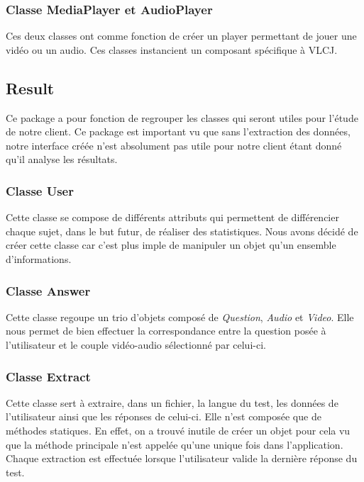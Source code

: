 \subsubsection{Classe MediaPlayer et AudioPlayer}\label{players}

Ces deux classes ont comme fonction de créer un player permettant de jouer une vidéo ou un audio. Ces classes instancient un composant spécifique à VLCJ. 

\subsection{Result}\label{Archi_Results}

Ce package a pour fonction de regrouper les classes qui seront utiles pour l'étude de notre client. Ce package est important vu que sans l'extraction des données, notre interface créée n'est absolument pas utile pour notre client étant donné qu'il analyse les résultats.

\subsubsection{Classe User}

Cette classe se compose de différents attributs qui permettent de différencier chaque sujet, dans le but futur, de réaliser des statistiques. Nous avons décidé de créer cette classe car c'est plus imple de manipuler un objet qu'un ensemble d'informations.

\subsubsection{Classe Answer}

Cette classe regoupe un trio d'objets composé de \textit{Question}, \textit{Audio} et \textit{Video}. Elle nous permet de bien effectuer la correspondance entre la question posée à l'utilisateur et le couple vidéo-audio sélectionné par celui-ci.

\subsubsection{Classe Extract}

Cette classe sert à extraire, dans un fichier, la langue du test, les données de l'utilisateur ainsi que les réponses de celui-ci. Elle n'est composée que de méthodes statiques. En effet, on a trouvé inutile de créer un objet pour cela vu que la méthode principale n'est appelée qu'une unique fois dans l'application. Chaque extraction est effectuée lorsque l'utilisateur valide la dernière réponse du test.

